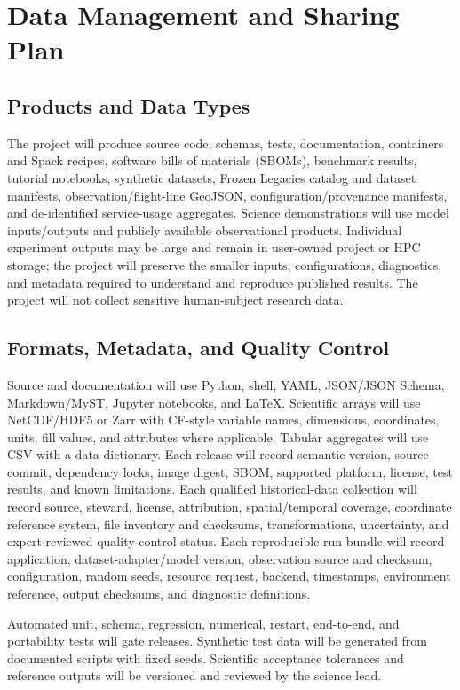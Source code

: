 \section*{Data Management and Sharing Plan}

\subsection*{Products and Data Types}

The project will produce source code, schemas, tests, documentation,
containers and Spack recipes, software bills of materials (SBOMs), benchmark
results, tutorial notebooks, synthetic datasets, Frozen Legacies catalog and
dataset manifests, observation/flight-line GeoJSON, configuration/provenance
manifests, and de-identified service-usage aggregates. Science demonstrations
will use model inputs/outputs and publicly available observational products.
Individual experiment outputs may be large and remain in user-owned project or
HPC storage; the project will preserve the smaller inputs, configurations,
diagnostics, and metadata required to understand and reproduce published
results. The project will not collect sensitive human-subject research data.

\subsection*{Formats, Metadata, and Quality Control}

Source and documentation will use Python, shell, YAML, JSON/JSON Schema,
Markdown/MyST, Jupyter notebooks, and LaTeX. Scientific arrays will use
NetCDF/HDF5 or Zarr with CF-style variable names, dimensions, coordinates,
units, fill values, and attributes where applicable. Tabular aggregates will
use CSV with a data dictionary. Each release will record semantic version,
source commit, dependency locks, image digest, SBOM, supported platform,
license, test results, and known limitations. Each qualified historical-data
collection will record source, steward, license, attribution,
spatial/temporal coverage, coordinate reference system, file inventory and
checksums, transformations, uncertainty, and expert-reviewed quality-control
status. Each reproducible run bundle will record application,
dataset-adapter/model version, observation source and checksum, configuration,
random seeds, resource request, backend, timestamps, environment reference,
output checksums, and diagnostic definitions.

Automated unit, schema, regression, numerical, restart, end-to-end, and
portability tests will gate releases. Synthetic test data will be generated
from documented scripts with fixed seeds. Scientific acceptance tolerances and
reference outputs will be versioned and reviewed by the science lead.

